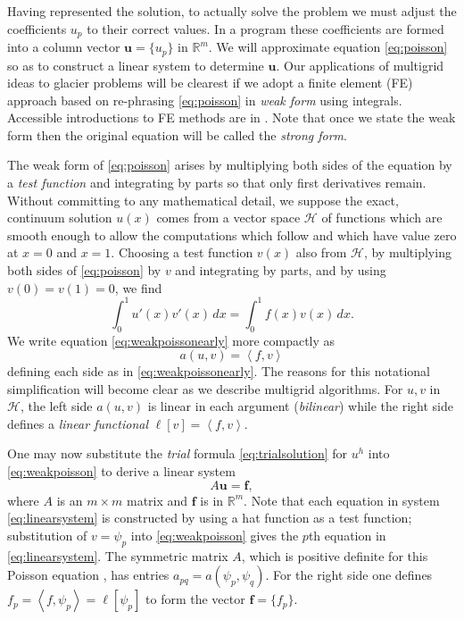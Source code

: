 \documentclass[letterpaper,final,12pt,reqno]{amsart}
\newcommand{\RR}{\mathbb{R}}
\newcommand{\bbf}{\mathbf{f}}
\newcommand{\bu}{\mathbf{u}}
\newcommand{\ip}[2]{\left<#1,#2\right>}
\begin{document}
Having represented the solution, to actually solve the problem we must adjust the coefficients $u_p$ to their correct values.  In a program these coefficients are formed into a column vector $\bu=\{u_p\}$ in $\RR^m$.  We will approximate equation \eqref{eq:poisson} so as to construct a linear system to determine $\bu$.  Our applications of multigrid ideas to glacier problems will be clearest if we adopt a finite element (FE) approach based on re-phrasing \eqref{eq:poisson} in \emph{weak form} using integrals.  Accessible introductions to FE methods are in \cite{Bueler2021,Elmanetal2014,Johnson2009}.  Note that once we state the weak form then the original equation will be called the \emph{strong form}.

The weak form of \eqref{eq:poisson} arises by multiplying both sides of the equation by a \emph{test function} and integrating by parts so that only first derivatives remain.  Without committing to any mathematical detail, we suppose the exact, continuum solution $u(x)$ comes from a vector space $\mathcal{H}$ of functions which are smooth enough to allow the computations which follow and which have value zero at $x=0$ and $x=1$.  Choosing a test function $v(x)$ also from $\mathcal{H}$, by multiplying both sides of \eqref{eq:poisson} by $v$ and integrating by parts, and by using $v(0)=v(1)=0$, we find
\begin{equation}
\int_0^1 u'(x) v'(x)\,dx = \int_0^1 f(x) v(x)\, dx.  \label{eq:weakpoissonearly}
\end{equation}
We write equation \eqref{eq:weakpoissonearly} more compactly as
\begin{equation}
  a(u,v) = \ip{f}{v} \label{eq:weakpoisson}
\end{equation}
defining each side as in \eqref{eq:weakpoissonearly}.  The reasons for this notational simplification will become clear as we describe multigrid algorithms.  For $u,v$ in $\mathcal{H}$, the left side $a(u,v)$ is linear in each argument (\emph{bilinear}) while the right side defines a \emph{linear functional} $\ell[v] = \ip{f}{v}$.

One may now substitute the \emph{trial} formula \eqref{eq:trialsolution} for $u^h$ into \eqref{eq:weakpoisson} to derive a linear system
\begin{equation}
A \bu = \bbf, \label{eq:linearsystem}
\end{equation}
where $A$ is an $m\times m$ matrix and $\bbf$ is in $\RR^m$.  Note that each equation in system \eqref{eq:linearsystem} is constructed by using a hat function as a test function; substitution of $v=\psi_p$ into \eqref{eq:weakpoisson} gives the $p$th equation in \eqref{eq:linearsystem}.  The symmetric matrix $A$, which is positive definite for this Poisson equation \cite{Elmanetal2014}, has entries $a_{pq} = a(\psi_p,\psi_q)$.  For the right side one defines $f_p = \ip{f}{\psi_p} = \ell[\psi_p]$ to form the vector $\bbf = \{f_p\}$.
\end{document}
